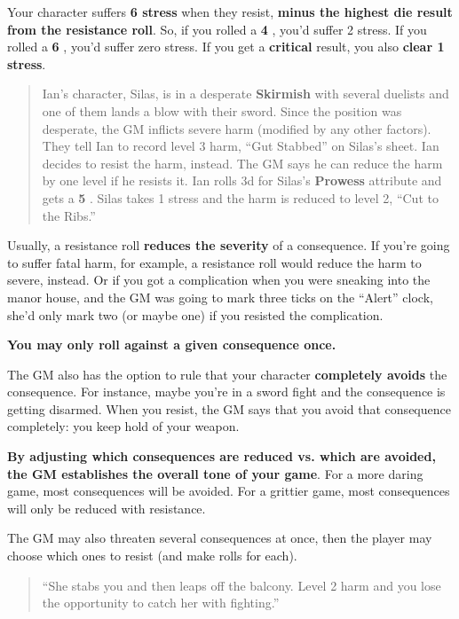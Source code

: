 \documentclass[11pt,oneside]{book}
\newcommand{\gameterm}[1]{\textbf{#1}}
\begin{document}
Your character suffers \textbf{6 stress} when they resist, \textbf{minus the highest die result from the resistance roll}. So, if you rolled a \gameterm{4} , you’d suffer 2 stress. If you rolled a \gameterm{6} , you’d suffer zero stress. If you get a \gameterm{critical}  result, you also \textbf{clear 1 stress}.

\begin{quote}
	Ian’s character, Silas, is in a desperate \gameterm{Skirmish}  with several duelists and one of them lands a blow with their sword. Since the position was desperate, the GM inflicts severe harm (modified by any other factors). They tell Ian to record level 3 harm, “Gut Stabbed” on Silas’s sheet. Ian decides to resist the harm, instead. The GM says he can reduce the harm by one level if he resists it. Ian rolls 3d for Silas’s \gameterm{Prowess}  attribute and gets a \gameterm{5} . Silas takes 1 stress and the harm is reduced to level 2, “Cut to the Ribs.”
\end{quote}

Usually, a resistance roll \textbf{reduces the severity} of a consequence. If you’re going to suffer fatal harm, for example, a resistance roll would reduce the harm to severe, instead. Or if you got a complication when you were sneaking into the manor house, and the GM was going to mark three ticks on the “Alert” clock, she’d only mark two (or maybe one) if you resisted the complication.

\textbf{You may only roll against a given consequence once.}

The GM also has the option to rule that your character \textbf{completely avoids} the consequence. For instance, maybe you’re in a sword fight and the consequence is getting disarmed. When you resist, the GM says that you avoid that consequence completely: you keep hold of your weapon.

\textbf{By adjusting which consequences are reduced vs. which are avoided, the GM establishes the overall tone of your game}. For a more daring game, most consequences will be avoided. For a grittier game, most consequences will only be reduced with resistance.

The GM may also threaten several consequences at once, then the player may choose which ones to resist (and make rolls for each).

\begin{quote}
	“She stabs you and then leaps off the balcony. Level 2 harm and you lose the opportunity to catch her with fighting.”
\end{quote}
\end{document}
